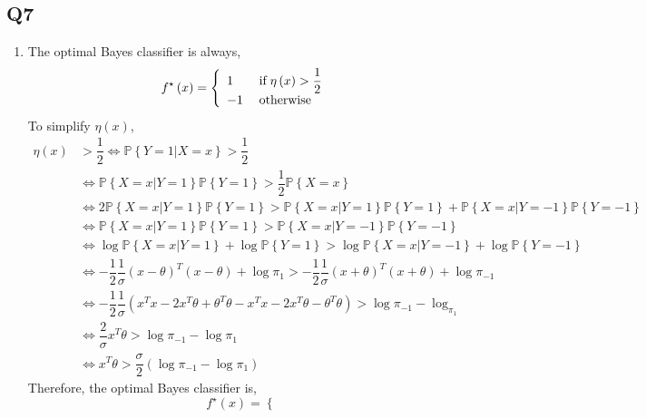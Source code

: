 \documentclass{article}
\begin{document}
\subsection{Q7}
\begin{enumerate}
\item The optimal Bayes classifier is always,
\[ f^\star \left(x\right) =\left\{ \begin{array}{ll}
1& \text{\;if\;} \eta\left(x\right) > \dfrac{1}{2} \\
-1& \text{\;otherwise\;} \\
\end{array}\right. \]
To simplify $\eta\left(x\right)$,
\begin{align*}
\eta\left(x\right) &> \dfrac{1}{2} \Leftrightarrow  \mathbb{P}\left\{Y = 1 | X = x\right\} > \dfrac{1}{2}
\\ &\Leftrightarrow  \mathbb{P}\left\{X = x | Y = 1\right\} \mathbb{P}\left\{Y = 1\right\} > \dfrac{1}{2} \mathbb{P}\left\{X = x\right\}
\\ &\Leftrightarrow  2 \mathbb{P}\left\{X = x | Y = 1\right\} \mathbb{P}\left\{Y = 1\right\} > \mathbb{P}\left\{X = x | Y = 1\right\} \mathbb{P}\left\{Y = 1\right\} + \mathbb{P}\left\{X = x | Y = -1\right\} \mathbb{P}\left\{Y = -1\right\}
\\ &\Leftrightarrow  \mathbb{P}\left\{X = x | Y = 1\right\} \mathbb{P}\left\{Y = 1\right\} > \mathbb{P}\left\{X = x | Y = -1\right\} \mathbb{P}\left\{Y = -1\right\}
\\ &\Leftrightarrow  \log \mathbb{P}\left\{X = x | Y = 1\right\} + \log \mathbb{P}\left\{Y = 1\right\} > \log \mathbb{P}\left\{X = x | Y = -1\right\} + \log \mathbb{P}\left\{Y = -1\right\}
\\ &\Leftrightarrow  - \dfrac{1}{2} \dfrac{1}{\sigma} \left(x - \theta\right)^{T} \left(x - \theta\right) + \log \pi_{1} > - \dfrac{1}{2} \dfrac{1}{\sigma} \left(x + \theta\right)^{T} \left(x + \theta\right) + \log \pi_{-1}
\\ &\Leftrightarrow  - \dfrac{1}{2} \dfrac{1}{\sigma} \left(x^{T} x - 2 x^{T} \theta + \theta^{T} \theta - x^{T} x - 2 x^{T} \theta - \theta^{T} \theta\right) > \log \pi_{-1} - \log_{\pi_{1}}
\\ &\Leftrightarrow  \dfrac{2}{\sigma} x^{T} \theta > \log \pi_{-1} - \log \pi_{1}
\\ &\Leftrightarrow  x^{T} \theta > \dfrac{\sigma}{2} \left(\log \pi_{-1} - \log \pi_{1}\right)
\end{align*}
Therefore, the optimal Bayes classifier is,
\[ f^\star \left(x\right) =\left\{ \begin{array}{ll}

\end{array}\]
\end{enumerate}
\end{document}
